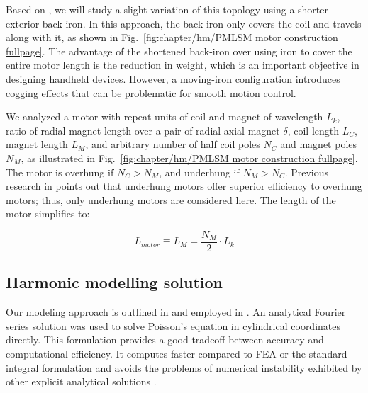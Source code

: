         
        Based on \cite{ruddy2014}, we will study a slight variation of this topology using a shorter exterior back-iron. In this approach, the back-iron only covers the coil and travels along with it, as shown in Fig.~\ref{fig:chapter/hm/PMLSM motor construction fullpage}. The advantage of the shortened back-iron over using iron to cover the entire motor length is the reduction in weight, which is an important objective in designing handheld devices. However, a moving-iron configuration introduces cogging effects that can be problematic for smooth motion control.
        
        
        We analyzed a motor with repeat units of coil and magnet of wavelength $L_k$, ratio of radial magnet length over a pair of radial-axial magnet $\delta$, coil length $L_C$, magnet length $L_M$, and arbitrary number of half coil poles  $N_C$ and magnet poles $N_M$, as illustrated in Fig.~\ref{fig:chapter/hm/PMLSM motor construction fullpage}. The motor is overhung if $N_C>N_M$, and underhung if $N_M>N_C$. Previous research in \cite{Ruddy2015} points out that underhung motors offer superior efficiency to overhung motors; thus, only underhung motors are considered here. The length of the motor simplifies to:
        
        
        \begin{equation}
            L_{motor}\equiv L_M=\frac{N_M}2\cdot L_k
            \label{eq:PMLSMs motor length}
        \end{equation}
        
    
    \subsection{Harmonic modelling solution}               \label{Chapter:PMLSM design HM/electromagnetic model/hm solution}

                
        Our modeling approach is outlined in \cite{Ruddy2011a} and employed in \cite{ruddy2014,Ruddy2015}. An analytical Fourier series solution was used to solve Poisson's equation in cylindrical coordinates directly. This formulation provides a good tradeoff between accuracy and computational efficiency. It computes faster compared to FEA \cite{Jin2014TheElectromagnetics} or the standard integral formulation \cite{Wang1999,Bianchi2000} and avoids the problems of numerical instability exhibited by other explicit analytical solutions \cite{Wijono2010,Yan2013}.
        
